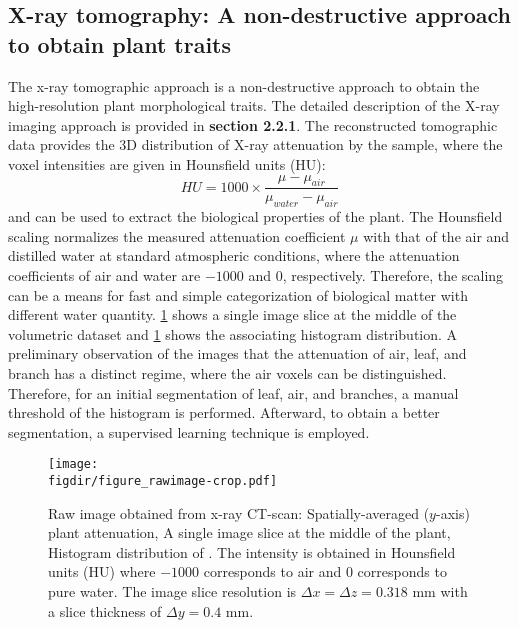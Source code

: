 \subsection{X-ray tomography: A non-destructive approach to obtain plant traits}
\label{subsec:xraytomo}

The x-ray tomographic approach is a non-destructive approach to obtain the high-resolution plant morphological traits. The detailed description of the X-ray imaging approach is provided in \textbf{section 2.2.1}. The reconstructed tomographic data provides the 3D distribution of X-ray attenuation by the sample, where the voxel intensities are given in Hounsfield units (HU):
\begin{equation}
\textit{HU} = 1000 \times \frac{\mu - \mu_{\textit{air}}}{\mu_{\textit{water}} - \mu_{\textit{air}} }
\end{equation}
and can be used to extract the biological properties of the plant. The Hounsfield scaling normalizes the measured attenuation coefficient $\mu$ with that of the air and distilled water at standard atmospheric conditions, where the attenuation coefficients of air and water are $-1000$ and $0$, respectively. Therefore, the scaling can be a means for fast and simple categorization of biological matter with different water quantity. \cref{fig:figure_rawimage} shows a single image slice at the middle of the volumetric dataset and \cref{fig:figure_rawimage} shows the associating histogram distribution. A preliminary observation of the images that the attenuation of air, leaf, and branch has a distinct regime, where the air voxels can be distinguished. Therefore, for an initial segmentation of leaf, air, and branches, a manual threshold of the histogram is performed. Afterward, to obtain a better segmentation, a supervised learning technique is employed.

\begin{figure}[t]
	\centering
	\texttt{[image: \\figdir/figure\_rawimage-crop.pdf]}
	\caption{Raw image obtained from x-ray CT-scan:  Spatially-averaged ($y$-axis) plant attenuation,  A single image slice at the middle of the plant,  Histogram distribution of . The intensity is obtained in Hounsfield units (HU) where $-1000$ corresponds to air and $0$ corresponds to pure water. The image slice resolution is $\Delta x = \Delta z=0.318$ mm with a slice thickness of $\Delta y=0.4$ mm.}
	\label{fig:figure_rawimage}
\end{figure}

